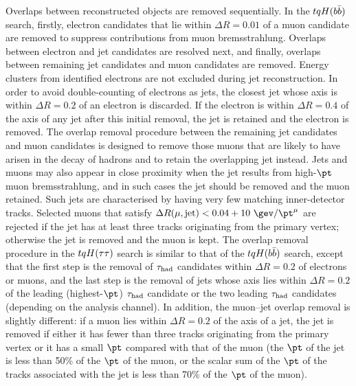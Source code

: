 Overlaps between reconstructed objects are removed sequentially. In the $tqH(b\bar{b})$ search, firstly, electron candidates that lie 
within $\Delta R = 0.01$ of a muon candidate are removed to suppress contributions from muon bremsstrahlung. 
Overlaps between electron and jet candidates are resolved next, and finally, overlaps between remaining jet candidates 
and muon candidates are removed. Energy clusters from identified electrons are not excluded during jet reconstruction. 
In order to avoid double-counting of electrons as jets, the closest jet whose axis is within ${\Delta}R = 0.2$ of an electron 
is discarded. If the electron is within ${\Delta}R = 0.4$ of the axis of any jet after this initial removal, the jet is retained and  the electron is removed.
The overlap removal procedure between the remaining jet candidates and muon candidates is designed to remove those muons 
that are likely to have arisen in the decay of hadrons and to retain the overlapping jet instead. 
Jets and muons may also appear in close proximity when the jet results from high-$\pt$ muon bremsstrahlung, 
and in such cases the jet should be removed and the muon retained. Such jets are characterised by having very 
few matching inner-detector tracks. Selected muons that satisfy $\Delta R(\mu,{\textrm{jet}}) < 0.04+10~\gev/\pt^\mu$ are rejected
if the jet has at least three tracks originating from the primary vertex; otherwise the jet is removed and the muon is kept.
The overlap removal procedure in the $tqH(\tau\tau)$ search is similar to that of the $tqH(b\bar{b})$ search, except that the
first step is the removal of $\tau_{\mathrm{had}}$ candidates within $\Delta R=0.2$ of electrons or muons, and the last step is the
removal of jets whose axis lies within $\Delta R=0.2$ of the leading (highest-$\pt$) $\tau_{\mathrm{had}}$ candidate or the two leading $\tau_{\mathrm{had}}$ candidates (depending on the
analysis channel). In addition, the muon--jet overlap removal is slightly different:
if a muon lies within $\Delta R = 0.2$ of the axis of a jet, the jet is removed if either it has fewer than three tracks originating from the 
primary vertex or it has a small $\pt$ compared with that of the muon (the $\pt$ of the jet is less than 50\% of the $\pt$ of the muon,
or the scalar sum of the $\pt$ of the tracks associated with the jet is less than 70\% of the $\pt$ of the muon).

